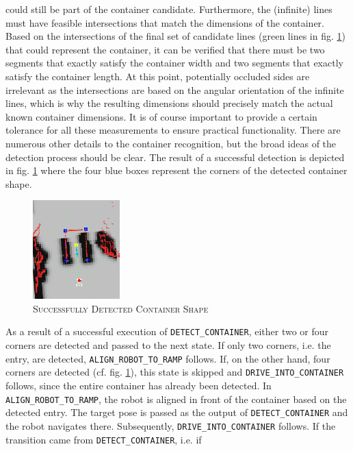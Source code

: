 \documentclass[english, master, utf8]{base/thesis_KBS}
\newcommand{\code}[1]{\colorbox{light-gray}{\texttt{#1}}}
\begin{document}
could still be part of the container candidate. Furthermore, the (infinite) lines must have feasible intersections that match the dimensions of the container. Based on the
intersections of the final set of candidate lines (green lines in fig. \ref{fig:detection_success}) that could represent the container, it can be verified that there must be two segments that exactly satisfy the container width and
two segments that exactly satisfy the container length. At this point, potentially occluded sides are irrelevant as the intersections are based on the angular orientation of the
infinite lines, which is why the resulting dimensions should precisely match the actual known container dimensions. It is of course important to provide a certain tolerance for all
these measurements to ensure practical functionality. There are numerous other details to the container recognition, but the broad ideas of the detection process should be clear.
The result of a successful detection is depicted in fig. \ref{fig:detection_success} where the four blue boxes represent the corners of the detected container shape.
\begin{figure}[H]
    \centering
    \includegraphics[width=0.3\textwidth]{pics/detection_success.png}
    \caption{\textsc{Successfully Detected Container Shape}}
    \label{fig:detection_success}
\end{figure}
As a result of a successful execution of \code{DETECT\_CONTAINER}, either two or four corners are detected and passed to the next state. If only two corners, i.e. the entry, are
detected, \code{ALIGN\_ROBOT\_TO\_RAMP} follows. If, on the other hand, four corners are detected (cf. fig. \ref{fig:detection_success}), this state is skipped and \code{DRIVE\_INTO\_CONTAINER} follows, since the entire
container has already been detected. In \code{ALIGN\_ROBOT\_TO\_RAMP}, the robot is aligned in front of the container based on the detected entry. The target pose is passed as the
output of \code{DETECT\_CONTAINER} and the robot navigates there. Subsequently, \code{DRIVE\_INTO\_CONTAINER} follows. If the transition came from \code{DETECT\_CONTAINER}, i.e. if
\end{document}
